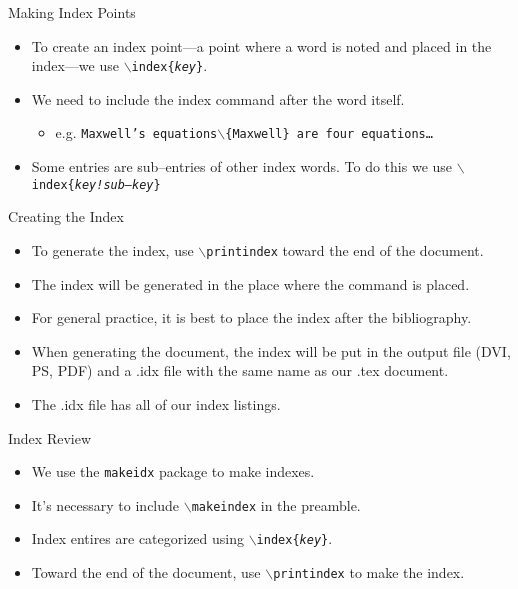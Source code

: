 \documentclass[pdf]{prosper}
\begin{document}
\begin{slide}{Making Index Points}
	\begin{itemize}
		\item To create an index point---a point where a word is noted and placed in the index---we use \texttt{$\backslash$index\{\textit{key}\}}.
		\item We need to include the index command after the word itself.
			\begin{itemize}
				\item e.g. \texttt{Maxwell's equations$\backslash$\{Maxwell\} are four equations\ldots}
			\end{itemize}
		\item Some entries are sub--entries of other index words. To do this we use \texttt{$\backslash$index\{\textit{key!sub--key}\}}
	\end{itemize}
\end{slide}
\begin{slide}{Creating the Index}
	\begin{itemize}
		\item To generate the index, use \texttt{$\backslash$printindex} toward the end of the document.
		\item The index will be generated in the place where the command is placed.
		\item For general practice, it is best to place the index after the bibliography.
		\item When generating the document, the index will be put in the output file (DVI, PS, PDF) and a .idx file with the same name as our .tex document.
		\item The .idx file has all of our index listings.
	\end{itemize}
\end{slide}
\begin{slide}{Index Review}
	\begin{itemize}
		\item We use the \texttt{makeidx} package to make indexes.
		\item It's necessary to include \texttt{$\backslash$makeindex} in the preamble.
		\item Index entires are categorized using \texttt{$\backslash$index\{\textit{key}\}}.
		\item Toward the end of the document, use \texttt{$\backslash$printindex} to make the index.
	\end{itemize}
\end{slide}
\end{document}
